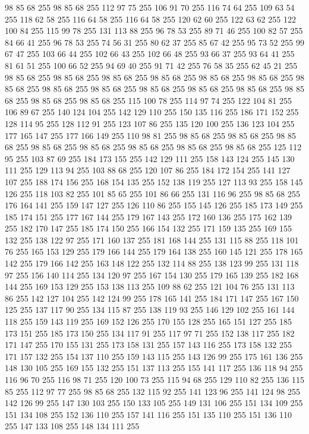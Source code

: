 98 85 68 255 98 85 68 255 112 97 75 255 106 91 70 255 116 74 64 255 109 63 54 255 118 62 58 255 116 64 58 255 116 64 58 255 120 62 60 255 122 63 62 255 122 100 84 255 115 99 78 255 131 113 88 255 96 78 53 255 89 71 46 255 100 82 57 255 84 66 41 255 96 78 53 255 74 56 31 255 80 62 37 255 85 67 42 255 95 73 52 255 99 67 47 255 103 66 44 255 102 66 43 255 102 66 48 255 93 66 37 255 93 64 41 255 81 61 51 255 100 66 52 255 94 69 40 255 91 71 42 255 76 58 35 255 62 45 21 255 98 85 68 255 98 85 68 255 98 85 68 255 98 85 68 255 98 85 68 255 98 85 68 255 98 85 68 255 98 85 68 255 98 85 68 255 98 85 68 255 98 85 68 255 98 85 68 255 98 85 68 255 98 85 68 255 98 85 68 255 115 100 78 255 114 97 74 255 122 104 81 255 106 89 67 255 140 124 104 255 142 129 110 255 150 135 116 255 186 171 152 255 128 114 95 255 128 112 91 255 123 107 86 255 135 120 100 255 136 123 104 255 177 165 147 255
177 166 149 255 110 98 81 255 98 85 68 255 98 85 68 255 98 85 68 255 98 85 68 255 98 85 68 255 98 85 68 255 98 85 68 255 98 85 68 255 125 112 95 255 103 87 69 255 184 173 155 255 142 129 111 255 158 143 124 255 145 130 111 255 129 113 94 255 103 88 68 255 120 107 86 255 184 172 154 255 141 127 107 255 188 174 156 255 168 154 135 255 152 138 119 255 127 113 93 255 158 145 126 255 118 103 82 255 101 85 65 255 101 86 66 255 131 116 96 255 98 85 68 255 176 164 141 255 159 147 127 255 126 110 86 255 155 145 126 255 185 173 149 255 185 174 151 255 177 167 144 255 179 167 143 255 172 160 136 255 175 162 139 255 182 170 147 255 185 174 150 255 166 154 132 255 171 159 135 255 169 155 132 255 138 122 97 255 171 160 137 255 181 168 144 255 131 115 88 255 118 101 76 255 165 153 129 255 179 166 144 255 179 164 138 255 160 145 121 255 178 165 142 255 179 166 142 255 163 148 122 255 132 114 88 255 138 123 99 255 131 118 97 255 156 140 114 255 134 120 97 255 167 154 130 255
179 165 139 255 182 168 144 255 169 153 129 255 153 138 113 255 109 88 62 255 121 104 76 255 131 113 86 255 142 127 104 255 142 124 99 255 178 165 141 255 184 171 147 255 167 150 125 255 137 117 90 255 134 115 87 255 138 119 93 255 146 129 102 255 161 144 118 255 159 143 119 255 169 152 126 255 170 155 128 255 165 151 127 255 185 173 151 255 185 173 150 255 134 117 91 255 117 97 71 255 152 138 117 255 182 171 147 255 170 155 131 255 173 158 131 255 157 143 116 255 173 158 132 255 171 157 132 255 154 137 110 255 159 143 115 255 143 126 99 255 175 161 136 255 148 130 105 255 169 155 132 255 151 137 113 255 155 141 117 255 136 118 94 255 116 96 70 255 116 98 71 255 120 100 73 255 115 94 68 255 129 110 82 255 136 115 85 255 112 97 77 255 98 85 68 255 132 115 92 255 141 123 96 255 141 124 98 255 142 126 99 255 147 130 103 255 150 133 105 255 149 131 106 255 151 134 109 255 151 134 108 255 152 136 110 255 157 141 116 255 151 135 110 255 151 136 110 255 147 133 108 255 148 134 111 255
